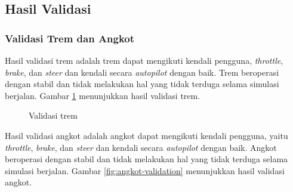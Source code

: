 \subsection{Hasil Validasi}


\subsubsection{Validasi Trem dan Angkot}

Hasil validasi trem adalah trem dapat mengikuti kendali pengguna,
\textit{throttle}, \textit{brake}, dan \textit{steer} dan kendali secara
\textit{autopilot} dengan baik. Trem beroperasi dengan stabil dan tidak
melakukan hal yang tidak terduga selama simulasi berjalan. Gambar
\ref{fig:tram-validation} menunjukkan hasil validasi trem.

\begin{figure}[!h]
    \centering
    \hfill
    \caption{Validasi trem}
    \label{fig:tram-validation}
\end{figure}

Hasil validasi angkot adalah angkot dapat mengikuti kendali pengguna, yaitu
\textit{throttle}, \textit{brake}, dan \textit{steer} dan kendali secara
\textit{autopilot} dengan baik. Angkot beroperasi dengan stabil dan tidak
melakukan hal yang tidak terduga selama simulasi berjalan. Gambar
\ref{fig:angkot-validation} menunjukkan hasil validasi angkot.

